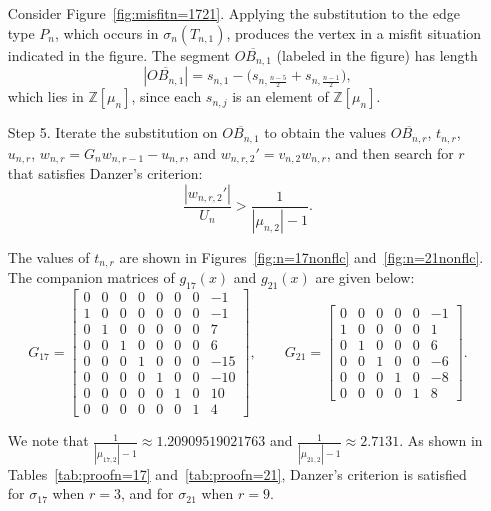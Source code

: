 \begin{enumerate}[leftmargin=20mm]
Consider Figure~\ref{fig:misfitn=1721}. Applying the substitution to the edge type \(P_n\), which occurs in \(\sigma_n(T_{n,1})\), produces the vertex in a misfit situation indicated in the figure. The segment \(\overline{OB_{n,1}}\) (labeled in the figure) has length
\[
|\overline{OB_{n,1}}|
= s_{n,1} - \bigl(s_{n,\frac{n-5}{2}} + s_{n,\frac{n-1}{2}}\bigr),
\]
which lies in \(\mathbb{Z}[\mu_n]\), since each \(s_{n,j}\) is an element of \(\mathbb{Z}[\mu_n]\).

\item[Step 5.] Iterate the substitution on \(\overline{OB_{n,1}}\) to obtain the values \(\overline{OB_{n,r}}\), $t_{n,r}$, $u_{n,r}$, $w_{n,r} = G_n w_{n,r-1} - u_{n,r}$, and $w_{n,r,2}' = v_{n,2} w_{n,r}$, and then search for \(r\) that satisfies Danzer's criterion:
\begin{equation}
\label{eq:danzer2}
\frac{|w_{n, r, 2}'|}{U_{n}}  > \frac{1}{|\mu_{n,2}| - 1}.
\end{equation}

The values of $t_{n,r}$ are shown in Figures~\ref{fig:n=17nonflc} and~\ref{fig:n=21nonflc}. The companion matrices of $g_{17}(x)$ and $g_{21}(x)$ are given below:
\[
G_{17}=
\begin{bmatrix}
0 & 0 & 0 & 0 & 0 & 0 & 0 & -1\\
1 & 0 & 0 & 0 & 0 & 0 & 0 & -1\\
0 & 1 & 0 & 0 & 0 & 0 & 0 & 7\\
0 & 0 & 1 & 0 & 0 & 0 & 0 & 6\\
0 & 0 & 0 & 1 & 0 & 0 & 0 & -15\\
0 & 0 & 0 & 0 & 1 & 0 & 0 & -10\\
0 & 0 & 0 & 0 & 0 & 1 & 0 & 10\\
0 & 0 & 0 & 0 & 0 & 0 & 1 & 4
\end{bmatrix},
\qquad
G_{21}=
\begin{bmatrix}
0 & 0 & 0 & 0 & 0 & -1\\
1 & 0 & 0 & 0 & 0 & 1\\
0 & 1 & 0 & 0 & 0 & 6\\
0 & 0 & 1 & 0 & 0 & -6\\
0 & 0 & 0 & 1 & 0 & -8\\
0 & 0 & 0 & 0 & 1 & 8
\end{bmatrix}.
\]

We note that \(\frac{1}{|\mu_{17,2}| - 1} \approx 1.20909519021763\) and \(\frac{1}{|\mu_{21,2}| - 1} \approx 2.7131\). As shown in Tables~\ref{tab:proofn=17} and~\ref{tab:proofn=21}, Danzer’s criterion is satisfied for \(\sigma_{17}\) when \(r = 3\), and for \(\sigma_{21}\) when \(r = 9\).

\end{enumerate}
